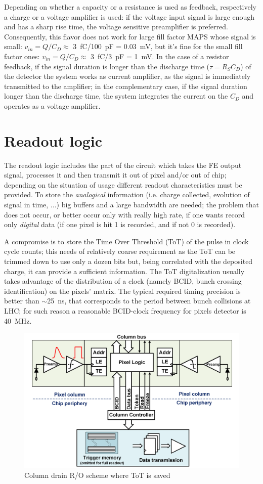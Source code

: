    Depending on whether a capacity or a resistance is used as feedback, respectively a charge or a voltage amplifier is used: if the voltage input signal is large enough and has a sharp rise time, the voltage sensitive preamplifier is preferred. Consequently, this flavor does not work for large fill factor MAPS whose signal is small: $v_{in} = Q/C_{D} \approx$ \SI{3}{fC}/\SI{100}{pF} = \SI{0.03}{mV}, but it's fine for the small fill factor ones: $v_{in} = Q/C_{D} \approx$ \SI{3}{fC}/\SI{3}{pF} = \SI{1}{mV}.
   In the case of a resistor feedback, if the signal duration is longer than the discharge time ($\tau=R_S C_D$) of the detector the system works as current amplifier, as the signal is immediately transmitted to the amplifier; in the complementary case, if the signal duration longer than the discharge time, the system integrates the current on the $C_D$ and operates as a voltage amplifier.
   
\section{Readout logic}
   The readout logic includes the part of the circuit which takes the FE output signal, processes it and then transmit it out of pixel and/or out of chip; depending on the situation of usage different readout characteristics must be provided. 
   To store the \textit{analogical} information (i.e. charge collected, evolution of signal in time, ...) big buffers and a large bandwidth are needed; the problem that does not occur, or better occur only with really high rate, if one wants record only \textit{digital} data (if one pixel is hit 1 is recorded, and if not 0 is recorded). 

   A compromise is to store the Time Over Threshold (ToT) of the pulse in clock cycle counts; this needs of relatively coarse requirement as the ToT can be trimmed down to use only a dozen bits but, being correlated with the deposited charge, it can provide a sufficient information.
   The ToT digitalization usually takes advantage of the distribution of a clock (namely BCID,  bunch crossing identification) on the pixels' matrix. The typical required timing precision is better than $\sim$\SI{25}{ns}, that corresponds to the period between bunch collisions at LHC; for such reason a reasonable BCID-clock frequency for pixels detector is \SI{40}{MHz}.
   \begin{figure}[h!]
      \centering
      \includegraphics[width=.7\linewidth]{figures/Pixel_detectors/column_drain_RO.png}
      \caption{Column drain R/O scheme where ToT is saved}
      \label{fig:column_drain_RO-like}
   \end{figure}


